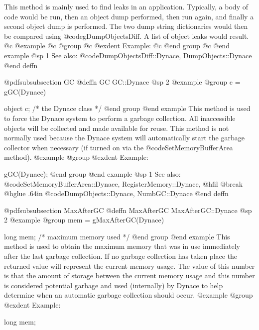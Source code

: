 This method is mainly used to find leaks in an application.  Typically,
a body of code would be run, then an object dump performed, then run
again, and finally a second object dump is performed.  The two dump
string dictionaries would then be compared using
@code{gDumpObjectsDiff}.  A list of object leaks would result.
@c @example
@c @group
@c @exdent Example:
@c @end group
@c @end example
@sp 1
See also:  @code{DumpObjectsDiff::Dynace, DumpObjects::Dynace}
@end deffn














@pdfsubsubsection {GC}
@deffn {GC} GC::Dynace
@sp 2
@example
@group
c = gGC(Dynace)

object  c;    /*  the Dynace class  */
@end group
@end example
This method is used to force the Dynace system to perform a garbage collection.
All inaccessible objects will be collected and made available for reuse.
This method is not normally used because the Dynace system will automatically
start the garbage collector when necessary (if turned on via the
@code{SetMemoryBufferArea} method).
@example
@group
@exdent Example:

gGC(Dynace);
@end group
@end example
@sp 1
See also:  @code{SetMemoryBufferArea::Dynace, RegisterMemory::Dynace,}
@hfil @break @hglue .64in    @code{DumpObjects::Dynace, NumbGC::Dynace}
@end deffn











@pdfsubsubsection {MaxAfterGC}
@deffn {MaxAfterGC} MaxAfterGC::Dynace
@sp 2
@example
@group
mem = gMaxAfterGC(Dynace)

long    mem;    /*  maximum memory used  */
@end group
@end example
This method is used to obtain the maximum memory that was in use
immediately after the last garbage collection.  If no garbage
collection has taken place the returned value will represent
the current memory usage.  The value of this number is that
the amount of storage between the current memory usage and this number
is considered potential garbage and used (internally) by Dynace
to help determine when an automatic garbage collection should occur.
@example
@group
@exdent Example:

long    mem;

